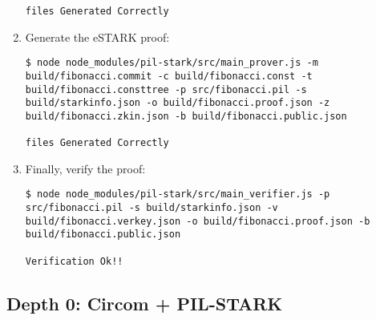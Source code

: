 \begin{enumerate}
\begin{lstlisting}[style=termt]
files Generated Correctly
\end{lstlisting}

\item Generate the eSTARK proof:
\begin{lstlisting}[style=termt]
$ node node_modules/pil-stark/src/main_prover.js -m build/fibonacci.commit -c build/fibonacci.const -t build/fibonacci.consttree -p src/fibonacci.pil -s build/starkinfo.json -o build/fibonacci.proof.json -z build/fibonacci.zkin.json -b build/fibonacci.public.json

files Generated Correctly
\end{lstlisting}

\item Finally, verify the proof:
\begin{lstlisting}[style=termt]
$ node node_modules/pil-stark/src/main_verifier.js -p src/fibonacci.pil -s build/starkinfo.json -v build/fibonacci.verkey.json -o build/fibonacci.proof.json -b build/fibonacci.public.json

Verification Ok!!
\end{lstlisting}
\end{enumerate}


\subsection{Depth 0: Circom + PIL-STARK}

